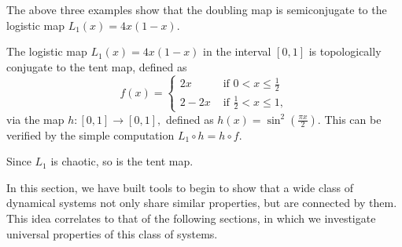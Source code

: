 \begin{example}\label{ex_logistic_and_doubling}
	The above three examples show that the doubling map is semiconjugate to the logistic map $L_1(x) = 4x(1-x)$.
\end{example}

\begin{example}\label{ex:logistic and tent}
	The logistic map $L_1(x) = 4x(1-x)$ in the interval $[0,1]$ is topologically conjugate to the tent map, defined as 
	\begin{equation}
		f(x) = 
		\begin{cases}
			2x   &\text{ if } 0<x \leq \frac{1}{2} \\ 
			2-2x &\text{ if } \frac{1}{2} < x \leq 1,
		\end{cases}
	\end{equation}
	via the map $h: [0,1] \rightarrow [0,1],$ defined as $h(x) = \sin^2(\frac{\pi x}{2})$.
	This can be verified by the simple computation $L_1 \circ h = h \circ f$.

	Since $L_1$ is chaotic, so is the tent map.
\end{example}

In this section, we have built tools to begin to show that a wide class of dynamical systems not only share similar properties, but are connected by them. This idea correlates to that of the following sections, in which we investigate universal properties of this class of systems.